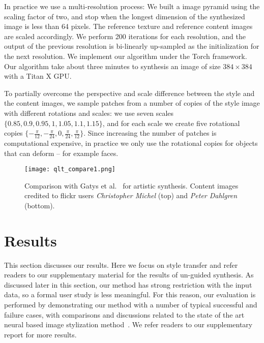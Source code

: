 \documentclass[10pt,twocolumn,letterpaper]{article}
\begin{document}
In practice we use a multi-resolution process: We built a image pyramid using the scaling factor of two, and stop when the longest dimension of the synthesized image is less than 64 pixels. The reference texture and reference content images are scaled accordingly. We perform 200 iterations for each resolution, and the output of the previous resolution is bi-linearly up-sampled as the initialization for the next resolution. We implement our algorithm under the Torch framework. Our algorithm take about three minutes to synthesis an image of size $384 \times 384$ with a Titan X GPU. 

To partially overcome the perspective and scale difference between the style and the content images, we sample patches from a number of copies of the style image with different rotations and scales: we use seven scales $\{0.85, 0.9, 0.95, 1, 1.05, 1.1, 1.15\}$, and for each scale we create five rotational copies $\{-\frac{\pi}{12}, -\frac{\pi}{24}, 0, \frac{\pi}{24}, \frac{\pi}{12}\}$. Since increasing the number of patches is computational expensive, in practice we only use the rotational copies for objects that can deform -- for example faces.

\begin{figure}[t]
	\centering
	\texttt{[image: qlt\_compare1.png]}
	\caption{Comparison with Gatys et al.~\cite{Gatys15} for artistic synthesis. Content images credited to flickr users \emph{Christopher Michel} (top) and \emph{Peter Dahlgren} (bottom).}\label{fig:qlt_compare1}
\end{figure}

\section{Results}
This section discusses our results. Here we focus on style transfer and refer readers to our supplementary material for the results of un-guided synthesis. As discussed later in this section, our method has strong restriction with the input data, so a formal user study is less meaningful. For this reason, our evaluation is performed by demonstrating our method with a number of typical successful and failure cases, with comparisons and discussions related to the state of the art neural based image stylization method~\cite{Gatys15}. We refer readers to our supplementary report for more results.
\end{document}
